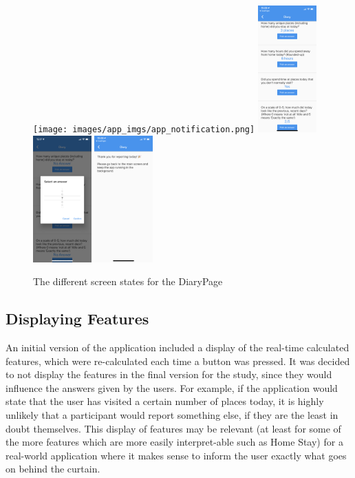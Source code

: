 \begin{figure}
    \centering
    \texttt{[image: images/app\_imgs/app\_notification.png]} \includegraphics[width=0.2\textwidth]{images/app_imgs/app_noanswers.png}
    \includegraphics[width=0.2\textwidth]{images/app_imgs/app_answering.png} \includegraphics[width=0.2\textwidth]{images/app_imgs/app_submitted.png}
    \caption{The different screen states for the DiaryPage}
    \label{fig:my_label}
\end{figure}

\subsection{Displaying Features}
An initial version of the application included a display of the real-time calculated features, which were re-calculated each time a button was pressed. It was decided to not display the features in the final version for the study, since they would influence the answers given by the users. For example, if the application would state that the user has visited a certain number of places today, it is highly unlikely that a participant would report something else, if they are the least in doubt themselves. This display of features may be relevant (at least for some of the more features which are more easily interpret-able such as Home Stay) for a real-world application where it makes sense to inform the user exactly what goes on behind the curtain.
